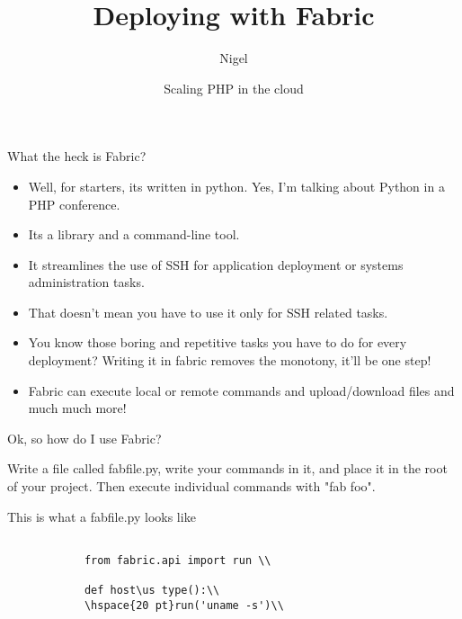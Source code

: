 \documentclass[xcolor=dvipsnames]{beamer}
\title{Deploying with Fabric}
\author{Nigel}
\date[phpcloud]{Scaling PHP in the cloud}
\def\us{\char`\_}
\begin{document}
    \begin{frame}
        \titlepage
    \end{frame}

    \begin{frame}{What the heck is Fabric?}
        \begin{itemize}
            \pause \item Well, for starters, its written in python.  \pause Yes, I'm talking about Python in a PHP conference.
            \pause \item Its a library and a command-line tool.
            \pause \item It streamlines the use of SSH for application deployment or systems administration tasks.
            \pause \item That doesn't mean you have to use it only for SSH related tasks.
            \pause \item You know those boring and repetitive tasks you have to do for every deployment?  Writing it in fabric removes the monotony, it'll be one step!
            \pause \item Fabric can execute local or remote commands and upload/download files and much much more!
        \end{itemize}
    \end{frame}

    \begin{frame}{Ok, so how do I use Fabric?}
        \begin{center}
        \pause Write a file called fabfile.py, write your commands in it, and place it in the root of your project.  Then execute individual commands with "fab foo".
        \end{center}
    \end{frame}
    
    \begin{frame}{This is what a fabfile.py looks like}
        \begin{verbatim}

            from fabric.api import run \\

            def host\us type():\\
            \hspace{20 pt}run('uname -s')\\
            
        \end{verbatim}

    \end{frame}
\end{document}
